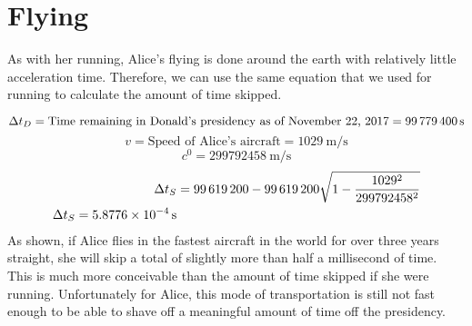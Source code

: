 \section{Flying}
	As with her running, Alice’s flying is done around the earth with relatively little acceleration time. Therefore, we can use the same equation that we used for running to calculate the amount of time skipped.

	\[\mathrm{\Delta} t_D = \text{Time remaining in Donald's presidency as of November 22, 2017} = \SI{99779400}{\second}\]
	\[v = \text{Speed of Alice's aircraft} = \SI{1029}{\metre/\second}\]
	\[\si{\clight} = \SI{299792458}{\metre/\second}\]
	\begin{align*}
		\mathrm{\Delta} t_S &= \num{99619200} - \num{99619200} \sqrt {1- \frac{1029^2}{299792458^2}}\\
		\mathrm{\Delta} t_S = \SI{5.8776e-4}{\second}
	\end{align*}
	As shown, if Alice flies in the fastest aircraft in the world for over three years straight, she will skip a total of slightly more than half a millisecond of time. This is much more conceivable than the amount of time skipped if she were running. Unfortunately for Alice, this mode of transportation is still not fast enough to be able to shave off a meaningful amount of time off the presidency.

